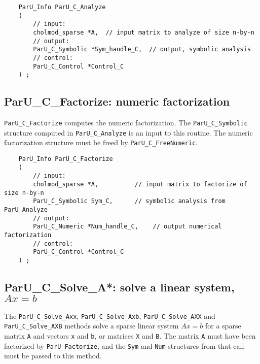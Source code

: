 \documentclass[12pt]{article}
\begin{document}
    {\footnotesize
    \begin{verbatim}
    ParU_Info ParU_C_Analyze
    (
        // input:
        cholmod_sparse *A,  // input matrix to analyze of size n-by-n
        // output:
        ParU_C_Symbolic *Sym_handle_C,  // output, symbolic analysis
        // control:
        ParU_C_Control *Control_C
    ) ; \end{verbatim} }

\subsection{{\sf ParU\_C\_Factorize}: numeric factorization}

    \verb'ParU_C_Factorize' computes the numeric factorization.  The
    \verb'ParU_C_Symbolic' structure computed in \verb'ParU_C_Analyze' is an
    input to this routine.  The numeric factorization structure must be freed
    by \verb'ParU_C_FreeNumeric'.

    {\footnotesize
    \begin{verbatim}
    ParU_Info ParU_C_Factorize
    (
        // input:
        cholmod_sparse *A,          // input matrix to factorize of size n-by-n
        ParU_C_Symbolic Sym_C,      // symbolic analysis from ParU_Analyze
        // output:
        ParU_C_Numeric *Num_handle_C,    // output numerical factorization
        // control:
        ParU_C_Control *Control_C
    ) ; \end{verbatim} }

\subsection{{\sf ParU\_C\_Solve\_A*}: solve a linear system, $Ax=b$}

    The \verb'ParU_C_Solve_Axx',  \verb'ParU_C_Solve_Axb',
    \verb'ParU_C_Solve_AXX' and \verb'ParU_C_Solve_AXB' methods solve a sparse
    linear system $Ax=b$ for a sparse matrix \verb'A' and vectors \verb'x' and
    \verb'b', or matrices \verb'X' and \verb'B'.  The matrix \verb'A' must have
    been factorized by \verb'ParU_Factorize', and the \verb'Sym' and \verb'Num'
    structures from that call must be passed to this method.
\end{document}
